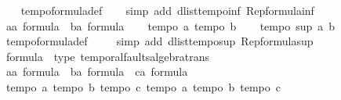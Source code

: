 \begin{isabellebody}
\ \ \isamarkupfalse%
\ tempo{}{\isacharunderscore}formula{\isacharunderscore}def\isanewline
\ \ \isamarkupfalse%
\ {\isacharparenleft}simp\ add{\isacharcolon}\ dlist{\isacharunderscore}tempo{}{\isacharunderscore}inf\ Rep{\isacharunderscore}formula{\isacharunderscore}inf{\isacharparenright}\isanewline
\ \ \isamarkupfalse%
\isanewline
\ \ \isamarkupfalse%
\ a{\isacharcolon}{\isacharcolon}{\isachardoublequoteopen}{\isacharprime}a\ formula{\isachardoublequoteclose}\ \ b{\isacharcolon}{\isacharcolon}{\isachardoublequoteopen}{\isacharprime}a\ formula{\isachardoublequoteclose}\isanewline
\ \ \isamarkupfalse%
\ {\isachardoublequoteopen}tempo{}\ a{\isachardoublequoteclose}\ {\isachardoublequoteopen}tempo{}\ b{\isachardoublequoteclose}\isanewline
\ \ \isamarkupfalse%
\ {\isachardoublequoteopen}tempo{}\ {\isacharparenleft}sup\ a\ b{\isacharparenright}{\isachardoublequoteclose}\isanewline
\ \ \isamarkupfalse%
\ tempo{}{\isacharunderscore}formula{\isacharunderscore}def\ \isanewline
\ \ \isamarkupfalse%
\ {\isacharparenleft}simp\ add{\isacharcolon}\ dlist{\isacharunderscore}tempo{}{\isacharunderscore}sup\ Rep{\isacharunderscore}formula{\isacharunderscore}sup{\isacharparenright}\isanewline
{}\isamarkupfalse%
%
\endisatagproof
{\isafoldproof}%
%
\isadelimproof
%
\endisadelimproof
\isanewline
\isanewline
{}\isamarkupfalse%
%
\isamarkuptrue%
\isamarkupfalse%
\ formula\ {\isacharcolon}{\isacharcolon}\ {\isacharparenleft}type{\isacharparenright}\ temporal{\isacharunderscore}faults{\isacharunderscore}algebra{\isacharunderscore}trans\isanewline
{}\isanewline
{}\isamarkupfalse%
%
\isadelimproof
\ %
\endisadelimproof
%
\isatagproof
{}\isamarkupfalse%
\isanewline
\ \ \isamarkupfalse%
\ a{\isacharcolon}{\isacharcolon}{\isachardoublequoteopen}{\isacharprime}a\ formula{\isachardoublequoteclose}\ \ b{\isacharcolon}{\isacharcolon}{\isachardoublequoteopen}{\isacharprime}a\ formula{\isachardoublequoteclose}\ \ c{\isacharcolon}{\isacharcolon}{\isachardoublequoteopen}{\isacharprime}a\ formula{\isachardoublequoteclose}\isanewline
\ \ \isamarkupfalse%
\ {\isachardoublequoteopen}tempo{}\ a{\isachardoublequoteclose}\ {\isachardoublequoteopen}tempo{}\ b{\isachardoublequoteclose}\ {\isachardoublequoteopen}tempo{}\ c{\isachardoublequoteclose}\ {\isachardoublequoteopen}tempo{}\ a{\isachardoublequoteclose}\ {\isachardoublequoteopen}tempo{}\ b{\isachardoublequoteclose}\ {\isachardoublequoteopen}tempo{}\ c{\isachardoublequoteclose}\isanewline

\end{isabellebody}
